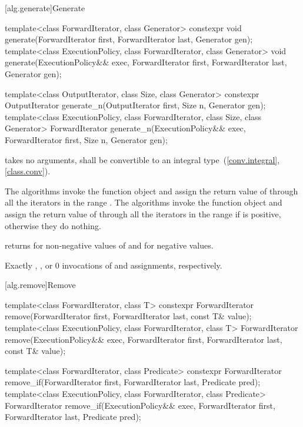 [alg.generate]{Generate}

%
%
\begin{itemdecl}
template<class ForwardIterator, class Generator>
  constexpr void generate(ForwardIterator first, ForwardIterator last,
                          Generator gen);
template<class ExecutionPolicy, class ForwardIterator, class Generator>
  void generate(ExecutionPolicy&& exec,
                ForwardIterator first, ForwardIterator last,
                Generator gen);

template<class OutputIterator, class Size, class Generator>
  constexpr OutputIterator generate_n(OutputIterator first, Size n, Generator gen);
template<class ExecutionPolicy, class ForwardIterator, class Size, class Generator>
  ForwardIterator generate_n(ExecutionPolicy&& exec,
                             ForwardIterator first, Size n, Generator gen);
\end{itemdecl}

\begin{itemdescr}
\pnum
\requires
{} takes no arguments,
shall be convertible to an integral type~(\ref{conv.integral}, \ref{class.conv}).

\pnum
\effects
The  algorithms invoke the function object  and assign the return
value of  through all the iterators in the range
. The  algorithms invoke the function object
 and assign the return value of  through all the iterators in
the range  if  is positive,
otherwise they do nothing.

\pnum
\returns {} returns  for non-negative values of 
and  for negative values.

\pnum
\complexity
Exactly
,
, or 0
invocations of  and assignments, respectively.
\end{itemdescr}

[alg.remove]{Remove}

%
%
\begin{itemdecl}
template<class ForwardIterator, class T>
  constexpr ForwardIterator remove(ForwardIterator first, ForwardIterator last,
                                   const T& value);
template<class ExecutionPolicy, class ForwardIterator, class T>
  ForwardIterator remove(ExecutionPolicy&& exec,
                         ForwardIterator first, ForwardIterator last,
                         const T& value);

template<class ForwardIterator, class Predicate>
  constexpr ForwardIterator remove_if(ForwardIterator first, ForwardIterator last,
                                      Predicate pred);
template<class ExecutionPolicy, class ForwardIterator, class Predicate>
  ForwardIterator remove_if(ExecutionPolicy&& exec,
                            ForwardIterator first, ForwardIterator last,
                            Predicate pred);
\end{itemdecl}

